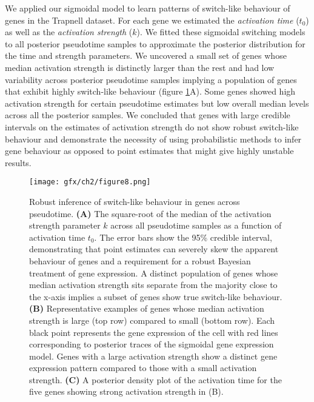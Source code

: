 We applied our sigmoidal model to learn patterns of switch-like behaviour of genes in the Trapnell dataset. For each gene we estimated the \emph{activation time} ($t_0$) as well as the \emph{activation strength} ($k$). We fitted these sigmoidal switching models to all posterior pseudotime samples to approximate the posterior distribution for the time and strength parameters. We uncovered a small set of genes whose median activation strength is distinctly larger than the rest and had low variability across posterior pseudotime samples implying a population of genes that exhibit highly switch-like behaviour (figure \ref{fig:switchres}A). Some genes showed high activation strength for certain pseudotime estimates but low overall median levels across all the posterior samples. We concluded that genes with large credible intervals on the estimates of activation strength do not show robust switch-like behaviour and demonstrate the necessity of using probabilistic methods to infer gene behaviour as opposed to point estimates that might give highly unstable results.

\begin{figure}
\centering
	\texttt{[image: gfx/ch2/figure8.png]}
\caption{ Robust inference of switch-like behaviour in genes across pseudotime.
\textbf{(A)} The square-root of the median of the activation strength parameter $k$ across all pseudotime samples as a function of activation time $t_0$. The error bars show the 95\% credible interval, demonstrating that point estimates can severely skew the apparent behaviour of genes and a requirement for a robust Bayesian treatment of gene expression. A distinct population of genes whose median activation strength sits separate from the majority close to the x-axis implies a subset of genes show true switch-like behaviour. \textbf{(B)} Representative examples of genes whose median activation strength is large (top row) compared to small (bottom row). Each black point represents the gene expression of the cell with red lines corresponding to posterior traces of the sigmoidal gene expression model. Genes with a large activation strength show a distinct gene expression pattern compared to those with a small activation strength. \textbf{(C)} A posterior density plot of the activation time for the five genes showing strong activation strength in (B).} \label{fig:switchres}
\end{figure}

